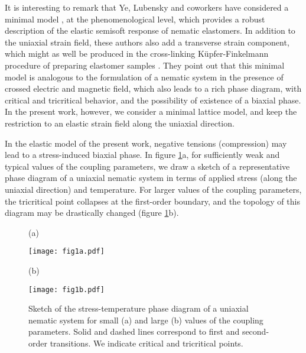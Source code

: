 \documentclass[aps,pre,reprint,amsmath,amssymbols,superscriptaddress,
nofootinbib]{revtex4-1}
\begin{document}
It is interesting to remark that Ye, Lubensky and coworkers
have considered a minimal model \cite{Ye2007,Ye2009}, at the
phenomenological level, which provides a robust
description of the elastic semisoft response of nematic elastomers. In
addition to the uniaxial strain field, these authors also add a transverse
strain component, which might as well be produced in the cross-linking
K\"{u}pfer-Finkelmann procedure of preparing elastomer samples
\cite{Kuepfer1991}. They point out that this minimal model is analogous to
the formulation of a nematic system in the presence of crossed electric and
magnetic field, which also leads to a rich phase diagram, with critical and
tricritical behavior, and the possibility of existence of a biaxial phase. In the
present work, however, we consider a minimal lattice model, and keep the
restriction to an elastic strain field along the uniaxial direction.

In the elastic model of the present work, negative tensions (compression) may
lead to a stress-induced biaxial phase. In figure \ref{fig:PhaseDiagram}a, for
sufficiently weak and typical values of the coupling parameters, we draw a sketch
of a representative phase diagram of a uniaxial nematic system in terms of
applied stress (along the uniaxial direction) and temperature. For larger values of
the coupling parameters, the tricritical point collapses at the first-order
boundary, and the topology of this diagram may be drastically changed (figure
\ref{fig:PhaseDiagram}b).

\begin{figure}
[ptb]
\begin{center}
(a)
\vspace{0.2cm}

\texttt{[image: fig1a.pdf]}%
\vspace{0.2cm}

(b)
\vspace{0.2cm}

\texttt{[image: fig1b.pdf]}%
\caption{Sketch of the stress-temperature phase diagram of a uniaxial nematic
system for small (a) and large (b) values of the
coupling parameters. Solid and dashed lines correspond to first and
second-order transitions. We indicate critical and tricritical points.}%
\label{fig:PhaseDiagram}
\end{center}
\end{figure}
\end{document}
